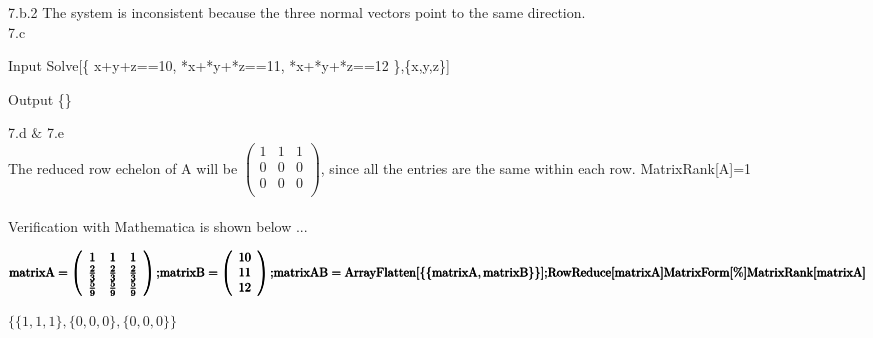 \documentclass[11pt,a4paper]{article}
\begin{document}
7.b.2 The system is inconsistent because the three normal vectors point to the same direction.\\

7.c\\
\begin{mmaCell}[addtoindex=1,morefunctionlocal={x, y, z}]{Input}
Solve[\{
x+y+z==10,
*x+*y+*z==11,
*x+*y+*z==12
\},\{x,y,z\}]
\end{mmaCell}

\begin{mmaCell}{Output}
\{\}
\end{mmaCell}

7.d $\&$ 7.e\\
The reduced row echelon of A will be \(\left(
\begin{array}{ccc}
 1 & 1 & 1 \\
 0 & 0 & 0 \\
 0 & 0 & 0 \\
\end{array}
\right)\), since all the entries are the same within each row. MatrixRank[A]=1\\
\\
Verification with Mathematica is shown below ...

\begin{doublespace}
\noindent\(\pmb{\text{matrixA}=\left(
\begin{array}{ccc}
 1 & 1 & 1 \\
 \frac{2}{3} & \frac{2}{3} & \frac{2}{3} \\
 \frac{5}{9} & \frac{5}{9} & \frac{5}{9} \\
\end{array}
\right);}\\
\pmb{\text{matrixB}=\left(
\begin{array}{c}
 10 \\
 11 \\
 12 \\
\end{array}
\right);}\\
\pmb{\text{matrixAB}=\text{ArrayFlatten}[\{\{\text{matrixA},\text{matrixB}\}\}];}\\
\pmb{\text{RowReduce}[\text{matrixA}]}\\
\pmb{\text{MatrixForm}[\%]}\\
\pmb{\text{MatrixRank}[\text{matrixA}]}\)
\end{doublespace}

\begin{doublespace}
\noindent\(\{\{1,1,1\},\{0,0,0\},\{0,0,0\}\}\)
\end{doublespace}
\end{document}
